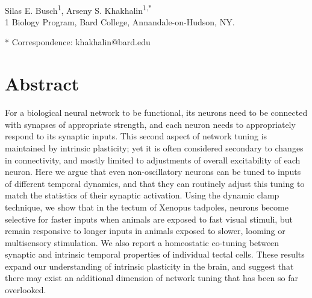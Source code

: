 \documentclass{article}
\begin{document}



\begin{flushleft}
{\Large
\textbf{}
}
\newline
\\
Silas E. Busch\textsuperscript{1},
Arseny S. Khakhalin\textsuperscript{1,*}
\\
\bigskip
{1} Biology Program, Bard College, Annandale-on-Hudson, NY. 

* Correspondence: khakhalin@bard.edu

\section*{Abstract}

For a biological neural network to be functional, its neurons need to be connected with synapses of appropriate strength, and each neuron needs to appropriately respond to its synaptic inputs. This second aspect of network tuning is maintained by intrinsic plasticity; yet it is often considered secondary to changes in connectivity, and mostly limited to adjustments of overall excitability of each neuron. Here we argue that even non-oscillatory neurons can be tuned to inputs of different temporal dynamics, and that they can routinely adjust this tuning to match the statistics of their synaptic activation. Using the dynamic clamp technique, we show that in the tectum of Xenopus tadpoles, neurons become selective for faster inputs when animals are exposed to fast visual stimuli, but remain responsive to longer inputs in animals exposed to slower, looming or multisensory stimulation. We also report a homeostatic co-tuning between synaptic and intrinsic temporal properties of individual tectal cells. These results expand our understanding of intrinsic plasticity in the brain, and suggest that there may exist an additional dimension of network tuning that has been so far overlooked.


\bigskip

\end{flushleft} %
\end{document}
